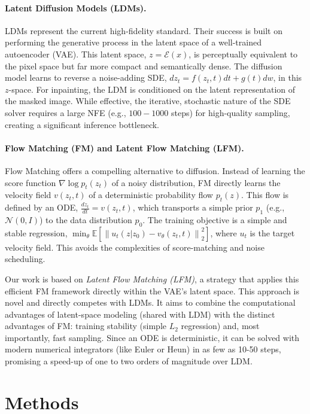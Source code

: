 \documentclass{article}
\newcommand{\E}{\mathbb{E}}
\newcommand{\norm}[1]{\left\lVert #1 \right\rVert}
\begin{document}
\paragraph{Latent Diffusion Models (LDMs).}
LDMs represent the current high-fidelity standard. Their success is built on performing the generative process in the latent space of a well-trained autoencoder (VAE). This latent space, $z = \mathcal{E}(x)$, is perceptually equivalent to the pixel space but far more compact and semantically dense. The diffusion model learns to reverse a noise-adding SDE, $dz_t = f(z_t, t)dt + g(t)dw$, in this $z$-space. For inpainting, the LDM is conditioned on the latent representation of the masked image. While effective, the iterative, stochastic nature of the SDE solver requires a large NFE (e.g., $100-1000$ steps) for high-quality sampling, creating a significant inference bottleneck.

\paragraph{Flow Matching (FM) and Latent Flow Matching (LFM).}
Flow Matching offers a compelling alternative to diffusion. Instead of learning the score function $\nabla \log p_t(z_t)$ of a noisy distribution, FM directly learns the velocity field $v(z_t, t)$ of a deterministic probability flow $p_t(z)$. This flow is defined by an ODE, $\frac{dz_t}{dt} = v(z_t, t)$, which transports a simple prior $p_1$ (e.g., $\mathcal{N}(0,I)$) to the data distribution $p_0$. The training objective is a simple and stable regression, $\min_\theta \E[ \norm{ u_t(z|z_0) - v_\theta(z_t, t) }_2^2 ]$, where $u_t$ is the target velocity field. This avoids the complexities of score-matching and noise scheduling.

Our work is based on \emph{Latent Flow Matching (LFM)}, a strategy that applies this efficient FM framework directly within the VAE's latent space. This approach is novel and directly competes with LDMs. It aims to combine the computational advantages of latent-space modeling (shared with LDM) with the distinct advantages of FM: training stability (simple $L_2$ regression) and, most importantly, fast sampling. Since an ODE is deterministic, it can be solved with modern numerical integrators (like Euler or Heun) in as few as 10-50 steps, promising a speed-up of one to two orders of magnitude over LDM.

\section{Methods}
\end{document}
